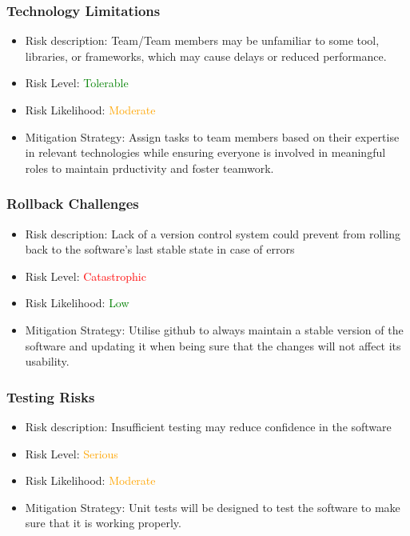 \documentclass{article}
\begin{document}
\subsubsection{Technology Limitations}
\begin{itemize}
    \item Risk description: Team/Team members may be unfamiliar to some tool, libraries, or frameworks, which may cause delays or reduced performance. 
    \item Risk Level: \textcolor{green}{Tolerable}
    \item Risk Likelihood: \textcolor{orange}{Moderate}
    \item Mitigation Strategy: Assign tasks to team members based on their expertise in relevant technologies while ensuring everyone is involved in meaningful roles to maintain prductivity and foster teamwork.
\end{itemize}

\subsubsection{Rollback Challenges}
\begin{itemize}
    \item Risk description: Lack of a version control system could prevent from rolling back to the software's last stable state in case of errors
    \item Risk Level: \textcolor{red}{Catastrophic}
    \item Risk Likelihood: \textcolor{green}{Low}
    \item Mitigation Strategy: Utilise github to always maintain a stable version of the software and updating it when being sure that the changes will not affect its usability. 
\end{itemize}

\subsubsection{Testing Risks}
\begin{itemize}
    \item Risk description: Insufficient testing may reduce confidence in the software
    \item Risk Level: \textcolor{orange}{Serious}
    \item Risk Likelihood: \textcolor{orange}{Moderate}
    \item Mitigation Strategy: Unit tests will be designed to test the software to make sure that it is working properly.
\end{itemize}
\end{document}
